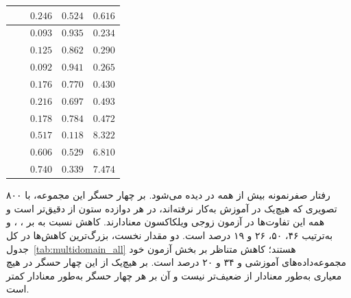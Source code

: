 \begin{table}[htbp]
\begin{adjustbox}{max width=\linewidth}
\begin{tabular}{rrccc}
& \tablepublishedmodel{} & $0.246$ & $0.524$ & $0.616$ \\ \hline
{}
& \tableproposedmodel{} & $0.093$ & $0.935$ & $\mathbf{0.234}$ \\
& \tablecontrolmodel{} & $0.125$ & $0.862$ & $0.290$ \\
& \tablepublishedmodel{} & $\mathbf{0.092}$ & $\mathbf{0.941}$ & $0.265$ \\ \hline
{}
& \tableproposedmodel{} & $\mathbf{0.176}$ & $0.770$ & $\mathbf{0.430}$ \\
& \tablecontrolmodel{} & $0.216$ & $0.697$ & $0.493$ \\
& \tablepublishedmodel{} & $0.178$ & $\mathbf{0.784}$ & $0.472$ \\ \hline
{}
& \tableproposedmodel{} & $\mathbf{0.517}$ & $0.118$ & $8.322$ \\
& \tablecontrolmodel{} & $0.606$ & $\mathbf{0.529}$ & $\mathbf{6.810}$ \\
& \tablepublishedmodel{} & $0.740$ & $0.339$ & $7.474$ \\ \hline
\end{tabular}
\end{adjustbox}
\end{table}

رفتار صفرنمونه \proposedmodel{} بیش از همه در  دیده می‌شود. بر چهار حسگر این مجموعه، با ۸۰۰ تصویری که هیچ‌یک در آموزش به‌کار نرفته‌اند، \proposedmodel{} در هر دوازده ستون از \controlmodel{} دقیق‌تر است و همه این تفاوت‌ها در آزمون زوجی ویلکاکسون معنادارند. کاهش  نسبت به \controlmodel{} بر ، ،  و  به‌ترتیب ۴۶، ۵۰، ۲۶ و ۱۹ درصد است. دو مقدار نخست، بزرگ‌ترین کاهش‌ها در کل جدول~\ref{tab:multidomain_all} هستند؛ کاهش متناظر بر بخش آزمون خود مجموعه‌داده‌های آموزشی  و  ۳۴ و ۲۰ درصد است. \proposedmodel{} بر هیچ‌یک از این چهار حسگر در هیچ معیاری به‌طور معنادار از \publishedbasemodel{} ضعیف‌تر نیست و  آن بر هر چهار حسگر به‌طور معنادار کمتر است.

